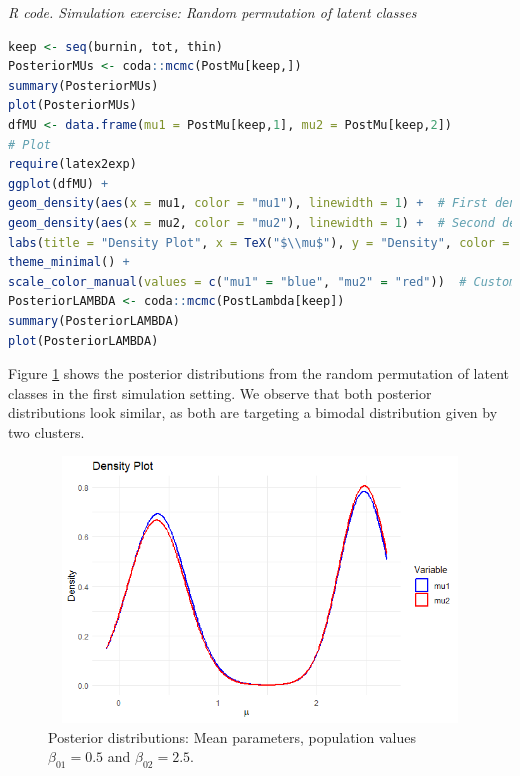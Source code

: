 \begin{tcolorbox}[enhanced,width=4.67in,center upper,
	fontupper=\large\bfseries,drop shadow southwest,sharp corners]
	\textit{R code. Simulation exercise: Random permutation of latent classes}
	\begin{VF}
		\begin{lstlisting}[language=R]
keep <- seq(burnin, tot, thin)
PosteriorMUs <- coda::mcmc(PostMu[keep,])
summary(PosteriorMUs)
plot(PosteriorMUs)
dfMU <- data.frame(mu1 = PostMu[keep,1], mu2 = PostMu[keep,2])
# Plot
require(latex2exp)
ggplot(dfMU) +
geom_density(aes(x = mu1, color = "mu1"), linewidth = 1) +  # First density plot
geom_density(aes(x = mu2, color = "mu2"), linewidth = 1) +  # Second density plot
labs(title = "Density Plot", x = TeX("$\\mu$"), y = "Density", color = "Variable") +
theme_minimal() +
scale_color_manual(values = c("mu1" = "blue", "mu2" = "red"))  # Custom colors
PosteriorLAMBDA <- coda::mcmc(PostLambda[keep])
summary(PosteriorLAMBDA)
plot(PosteriorLAMBDA)
		\end{lstlisting}
	\end{VF}
\end{tcolorbox}

Figure \ref{figMeanPerm} shows the posterior distributions from the random permutation of latent classes in the first simulation setting. We observe that both posterior distributions look similar, as both are targeting a bimodal distribution given by two clusters.

\begin{figure}[!h]
	\includegraphics[width=340pt, height=200pt]{Chapters/chapter11/figures/Permutation.png}
	\caption[List of figure caption goes here]{Posterior distributions: Mean parameters, population values $\beta_{01}=0.5$ and $\beta_{02}=2.5$.}\label{figMeanPerm}
\end{figure}
 
